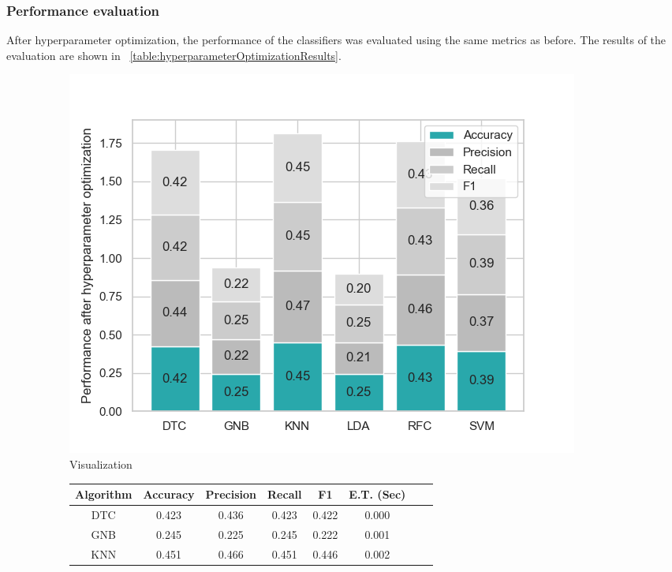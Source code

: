 \documentclass[conference,onecolumn]{IEEEtran}
\begin{document}
        \subsubsection{Performance evaluation}
        After hyperparameter optimization, the performance of the classifiers was evaluated using the same metrics as before. The results of the evaluation are shown in \tablename~\ref{table:hyperparameterOptimizationResults}.
        \begin{figure}[H]
            \centering
            \begin{subfigure}{0.45\textwidth}
                \centering
                \includegraphics[width=\linewidth]{Plots/Performance_after_dimensionality_reduction_and_HP_optimization.png}
                \caption{Visualization}
                \label{fig:performanceAfterHyperparameterOptimization}
            \end{subfigure}%
            \begin{subfigure}{0.55\textwidth}
                \centering
                \small
                \begin{tabular}{|c|c|c|c|c|c|c|c|}
                    \hline
                        \textbf{Algorithm} &\textbf{Accuracy} &\textbf{Precision} &\textbf{Recall} &\textbf{F1} &\textbf{E.T. (Sec)} \\ \hline
                        \hline
                        DTC    & 0.423   & 0.436   & 0.423  & 0.422   & 0.000  \\ \hline
                        GNB    & 0.245   & 0.225   & 0.245  & 0.222   & 0.001  \\ \hline
                        KNN    & 0.451   & 0.466   & 0.451  & 0.446   & 0.002  \\ \hline

\end{tabular}
\end{subfigure}
\end{figure}
\end{document}
